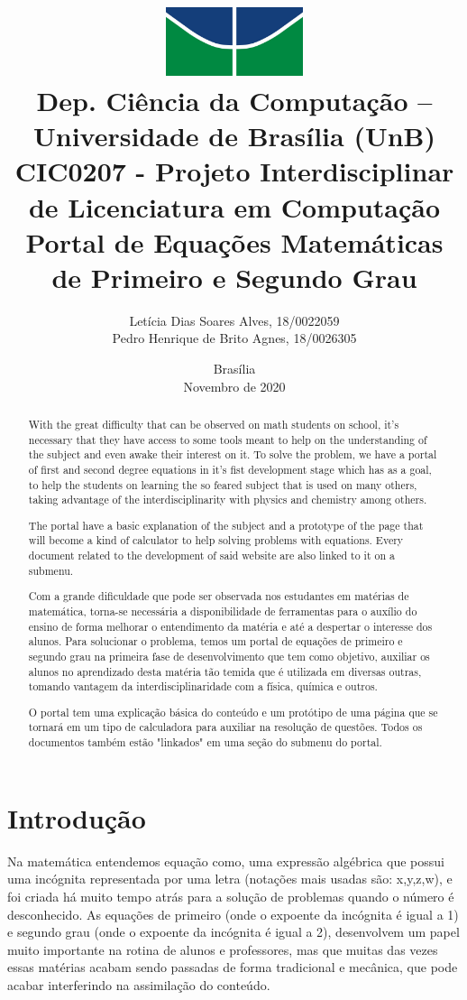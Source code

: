 \documentclass[12pt]{report}
\title{
        \includegraphics[width=4cm]{img/logo.jpg} \\ 
        \large
        Dep. Ciência da Computação -- Universidade de Brasília (UnB)\\
        CIC0207 - Projeto Interdisciplinar de Licenciatura em Computação \\
        \vfill 
        \vfill
        \LARGE
        \textbf{Portal de Equações Matemáticas de Primeiro e Segundo Grau}
    }
\author{
        Letícia Dias Soares Alves, 18/0022059\\
        Pedro Henrique de Brito Agnes, 18/0026305
    }
\affil{
        \vfill
        \vfill
        \vfill
        Professora \\
        Dr.a Letícia Lopes Leite
    }
\date{Brasília\\Novembro de 2020}
\begin{document}
\maketitle

\begin{abstract}
  With the great difficulty that can be observed on math students on school, it's necessary that they have access to some tools meant to help on the understanding of the subject and even awake their interest on it. To solve the problem, we have a portal of first and second degree equations in it's fist development stage which has as a goal, to help the students on learning the so feared subject that is used on many others, taking advantage of the interdisciplinarity with physics and chemistry among others.

  The portal have a basic explanation of the subject and a prototype of the page that will become a kind of calculator to help solving problems with equations. Every document related to the development of said website are also linked to it on a submenu.
\end{abstract}

\begin{abstract}
  Com a grande dificuldade que pode ser observada nos estudantes em matérias de matemática, torna-se necessária a disponibilidade de ferramentas para o auxílio do ensino de forma melhorar o entendimento da matéria e até a despertar o interesse dos alunos. Para solucionar o problema, temos um portal de equações de primeiro e segundo grau na primeira fase de desenvolvimento que tem como objetivo, auxiliar os alunos no aprendizado desta matéria tão temida que é utilizada em diversas outras, tomando vantagem da interdisciplinaridade com a física, química e outros.

  O portal tem uma explicação básica do conteúdo e um protótipo de uma página que se tornará em um tipo de calculadora para auxiliar na resolução de questões. Todos os documentos também estão "linkados" em uma seção do submenu do portal.
\end{abstract}

\tableofcontents
\newpage

\chapter{Introdução}
Na matemática entendemos equação como, uma expressão algébrica que possui uma incógnita representada por uma letra (notações mais usadas são: x,y,z,w), e foi criada há muito tempo atrás para a solução de problemas quando o número é desconhecido. As equações de primeiro (onde o expoente da incógnita é igual a 1) e segundo grau  (onde o expoente da incógnita é igual a 2), desenvolvem um papel muito importante na rotina de alunos e professores, mas que muitas das vezes essas matérias acabam sendo passadas de forma tradicional e mecânica, que pode acabar interferindo na assimilação do conteúdo.
\end{document}
